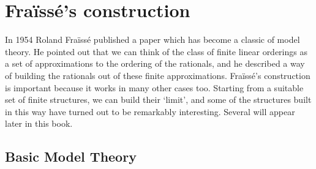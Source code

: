 \chapter{Fraïssé’s construction}

In 1954 Roland Fraïssé published a paper which has become a classic of model theory. He pointed out that we can think of the class of finite linear orderings as a set of approximations to the ordering of the rationals, and he described a way of building the rationals out of these finite approximations. Fraïssé’s construction is important because it works in many other cases too. Starting from a suitable set of finite structures, we can build their ‘limit’, and some of the structures built in this way have turned out to be remarkably interesting. Several will appear later in this book.

\section{Basic Model Theory}

